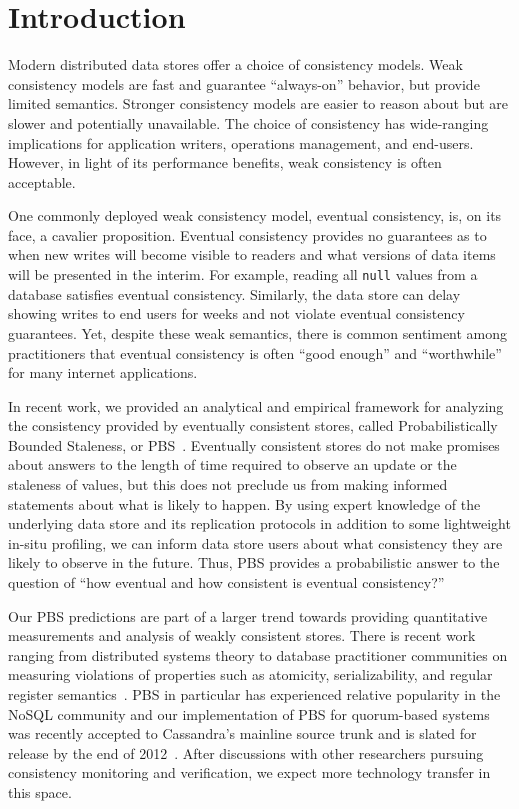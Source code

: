 \section{Introduction}

Modern distributed data stores offer a choice of consistency
models. Weak consistency models are fast and guarantee ``always-on''
behavior, but provide limited semantics. Stronger consistency models
are easier to reason about but are slower and potentially
unavailable. The choice of consistency has wide-ranging implications
for application writers, operations management, and
end-users. However, in light of its performance benefits, weak
consistency is often acceptable.

One commonly deployed weak consistency model, eventual
consistency, is, on its face, a cavalier proposition. Eventual
consistency provides no guarantees as to when new writes will become
visible to readers and what versions of data items will be presented
in the interim. For example, reading all \texttt{null} values from a
database satisfies eventual consistency. Similarly, the data store can
delay showing writes to end users for weeks and not violate eventual
consistency guarantees. Yet, despite these weak semantics, there is
common sentiment among practitioners that eventual consistency is
often ``good enough'' and ``worthwhile'' for many
internet applications.

In recent work, we provided an analytical and empirical framework for
analyzing the consistency provided by eventually consistent stores,
called Probabilistically Bounded Staleness, or
PBS~\cite{pbs-vldb2012}. Eventually consistent stores do not make promises
about answers to the length of time required to observe an update or
the staleness of values, but this does not preclude us from making
informed statements about what is likely to happen. By using expert
knowledge of the underlying data store and its replication protocols
in addition to some lightweight in-situ profiling, we can inform data
store users about what consistency they are likely to observe in the
future. Thus, PBS provides a probabilistic answer to the question 
of ``how eventual and how consistent is eventual consistency?''

Our PBS predictions are part of a larger trend towards providing
quantitative measurements and analysis of weakly consistent
stores. There is recent work ranging from distributed systems theory
to database practitioner communities on measuring violations of
properties such as atomicity, serializability, and regular register
semantics~\cite{hotdep}. PBS in particular has experienced relative
popularity in the NoSQL community and our implementation of PBS for
quorum-based systems was recently accepted to Cassandra's mainline
source trunk and is slated for release by the end of
2012~\cite{cassandra-pbs-patch}. After discussions with other
researchers pursuing consistency monitoring and verification, we
expect more technology transfer in this space.

